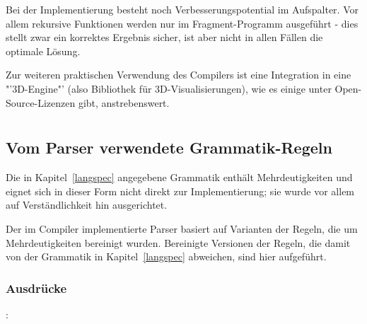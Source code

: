 \documentclass[twoside,a4paper,fleqn,12pt]{book}
\begin{document}
Bei der Implementierung besteht noch Verbesserungspotential im Aufspalter. 
Vor allem rekursive Funktionen werden nur im Fragment-Programm ausgeführt - dies stellt zwar ein korrektes
Ergebnis sicher, ist aber nicht in allen Fällen die optimale Lösung.


Zur weiteren praktischen Verwendung des Compilers ist eine Integration in eine "'3D-Engine"' (also Bibliothek für 3D-Visualisierungen), wie es einige
unter Open-Source-Lizenzen gibt, anstrebenswert.

\cleardoublepage
\appendix

\chapter[Anhang]{}

\section{Vom Parser verwendete Grammatik-Regeln}
\label{grammar_fixes}

Die in Kapitel~\ref{langspec} angegebene Grammatik enthält Mehrdeutigkeiten und eignet sich in dieser Form nicht direkt zur Implementierung;
sie wurde vor allem auf Verständlichkeit hin ausgerichtet.

Der im Compiler implementierte Parser basiert auf Varianten der Regeln, die um Mehrdeutigkeiten bereinigt wurden.
Bereinigte Versionen der Regeln, die damit von der Grammatik in Kapitel~\ref{langspec} abweichen, sind hier aufgeführt. 

\subsection{Ausdrücke}
:\label{ORIG_ausdruck}\\
\hspace*{1cm} \Gspace{}\\
\end{document}
